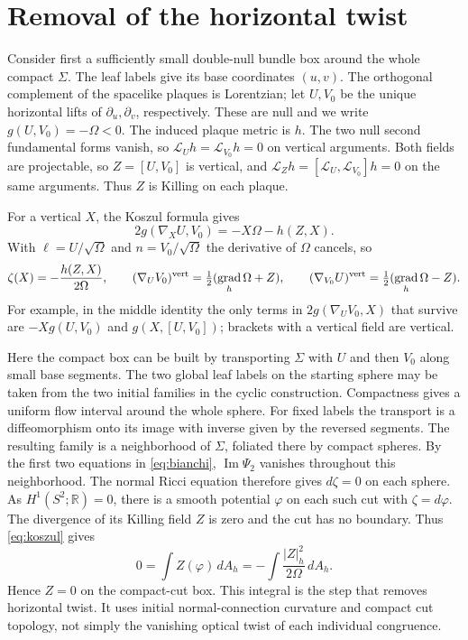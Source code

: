\documentclass[11pt]{article}
\DeclareMathOperator{\grad}{grad}
\newcommand{\Lie}{\mathcal L}
\begin{document}
\section{Removal of the horizontal twist}

Consider first a sufficiently small double-null bundle box around the
whole compact $\Sigma$. The leaf labels give its base coordinates
$(u,v)$. The orthogonal complement of the spacelike plaques is
Lorentzian; let $U,V_0$ be the unique horizontal lifts of
$\partial_u,\partial_v$, respectively. These are null and we write
$g(U,V_0)=-\Omega<0$. The induced plaque metric is $h$.
The two null second fundamental forms vanish, so
$\Lie_Uh=\Lie_{V_0}h=0$ on vertical arguments. Both fields are
projectable, so $Z=[U,V_0]$ is vertical, and
$\Lie_Z h=[\Lie_U,\Lie_{V_0}]h=0$ on the same arguments. Thus $Z$
is Killing on each plaque.

For a vertical $X$, the Koszul formula gives
\[
 2g(\nabla_X U,V_0)=-X\Omega-h(Z,X).
\]
With $\ell=U/\sqrt{\Omega}$ and $n=V_0/\sqrt{\Omega}$ the derivative
of $\Omega$ cancels, so
\begin{equation}\label{eq:koszul}
 \zeta(X)=-\frac{h(Z,X)}{2\Omega},\qquad
 (\nabla_U V_0)^{\rm vert}=\tfrac12(\grad_h\Omega+Z),\qquad
 (\nabla_{V_0} U)^{\rm vert}=\tfrac12(\grad_h\Omega-Z).
\end{equation}
For example, in the middle identity the only terms in
$2g(\nabla_U V_0,X)$ that survive are $-Xg(U,V_0)$ and
$g(X,[U,V_0])$; brackets with a vertical field are vertical.

Here the compact box can be built by transporting $\Sigma$ with $U$
and then $V_0$ along small base segments. The two global leaf labels
on the starting sphere may be taken from the two initial families
in the cyclic construction. Compactness gives a uniform flow
interval around the whole sphere. For fixed labels the transport is a
diffeomorphism onto its image with inverse given by the reversed
segments. The resulting family is a neighborhood of $\Sigma$,
foliated there by compact spheres. By the first two equations
in \eqref{eq:bianchi}, $\operatorname{Im}\Psi_2$ vanishes throughout
this neighborhood. The normal Ricci equation therefore gives
$d\zeta=0$ on each sphere. As $H^1(S^2;\mathbb R)=0$, there is a
smooth potential $\varphi$ on each such cut with $\zeta=d\varphi$.
The divergence of its Killing field $Z$ is zero and the cut has no
boundary. Thus \eqref{eq:koszul} gives
\[
    0=\int Z(\varphi)\,dA_h
      =-\int\frac{|Z|_h^2}{2\Omega}\,dA_h .
\]
Hence $Z=0$ on the compact-cut box. This integral is the step
that removes horizontal twist. It uses initial normal-connection
curvature and compact cut topology, not simply the vanishing optical
twist of each individual congruence.
\end{document}
